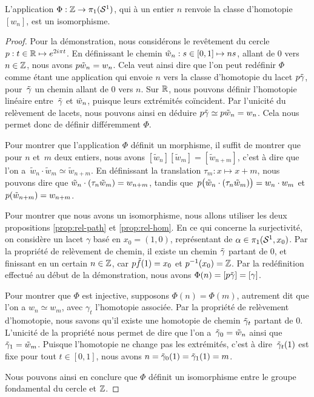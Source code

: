\begin{theorem}\label{th:grp-funda-circle}
L'application $\Phi:\mathbb{Z}\to\pi_1(\mathcal{S}^{1})$, qui à un entier $n$ renvoie la classe d'homotopie $[w_n]$, est un isomorphisme.
\end{theorem}

\begin{proof}
Pour la démonstration, nous considérons le revêtement du cercle ${p:t\in\mathbb{R}\mapsto e^{2i\pi t}}$. En définissant le chemin $\Tilde{w}_n:s\in[0,1]\mapsto ns$, allant de 0 vers~$n\in\mathbb{Z}$, nous avons $p\Tilde{w}_n=w_n$. Cela veut ainsi dire que l'on peut redéfinir $\Phi$ comme étant une application qui envoie $n$ vers la classe d'homotopie du lacet $p\Tilde{\gamma}$, pour~$\Tilde{\gamma}$ un chemin allant de $0$ vers $n$. Sur $\mathbb{R}$, nous pouvons définir l'homotopie linéaire entre~$\Tilde{\gamma}$ et $\Tilde{w}_n$, puisque leurs extrémités coïncident. Par l'unicité du relèvement de lacets, nous pouvons ainsi en déduire $p\Tilde{\gamma}\simeq p\Tilde{w}_n=w_n$. Cela nous permet donc de définir différemment $\Phi$.

\bigskip Pour montrer que l'application $\Phi$ définit un morphisme, il suffit de montrer que pour $n$ et~$m$ deux entiers, nous avons $[\tilde{w}_n][\tilde{w}_m]=[\tilde{w}_{n+m}]$, c'est à dire que l'on a~$\tilde{w}_n\cdot \tilde{w}_m\simeq \tilde{w}_{n+m}$. En définissant la translation $\tau_m:x\mapsto x+m$, nous pouvons dire que $\Tilde{w}_n\cdot(\tau_n \tilde{w}_m)=w_{n+m}$, tandis que~$p\big(\Tilde{w}_n\cdot(\tau_n \Tilde{w}_m)\big)=w_n\cdot w_m$ et~$p(\Tilde{w}_{n+m})=w_{n+m}$.

Pour montrer que nous avons un isomorphisme, nous allons utiliser les deux propositions \ref{prop:rel-path} et \ref{prop:rel-hom}. En ce qui concerne la surjectivité, on considère un lacet $\gamma$ basé en $x_0=(1,0)$, représentant de $\alpha\in\pi_1(\mathcal{S}^{1},x_0)$. Par la propriété de relèvement de chemin, il existe un chemin $\Tilde{\gamma}$ partant de 0, et finissant en un certain $n\in\mathbb{Z}$, car $p\Tilde{f}(1)=x_0$ et $p^{-1}(x_0)=\mathbb{Z}$. Par la redéfinition effectué au début de la démonstration, nous avons $\Phi(n)=[p\Tilde{\gamma}]=[\gamma]$.

Pour montrer que $\Phi$ est injective, supposons $\Phi(n)=\Phi(m)$, autrement dit que l'on a $w_n\simeq w_m$, avec $\gamma_t$ l'homotopie associée. Par la propriété de relèvement d'homotopie, nous savons qu'il existe une homotopie de chemin $\Tilde{\gamma}_t$ partant de 0. L'unicité de la propriété nous permet de dire que l'on a~$\Tilde{\gamma}_0=\Tilde{w}_n$ ainsi que~$\Tilde{\gamma}_1=\Tilde{w}_m$. Puisque l'homotopie ne change pas les extrémités, c'est à dire~$\Tilde{\gamma}_t(1)$ est fixe pour tout $t\in[0,1]$, nous avons $n=\Tilde{\gamma}_0(1)=\Tilde{\gamma}_1(1)=m$.

\bigskip Nous pouvons ainsi en conclure que $\Phi$ définit un isomorphisme entre le groupe fondamental du cercle et $\mathbb{Z}$.
\end{proof}

